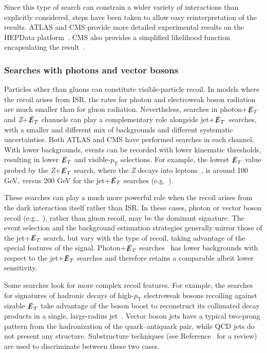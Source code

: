 \documentclass{ar-1col}
\newcommand{\pt}{\ensuremath{p_\mathrm{T}}\xspace}
\newcommand{\pT}{\ensuremath{p_\mathrm{T}}\xspace}
\newcommand{\MET}{\ensuremath{\slashed{E}_T}\xspace}
\begin{document}
{Since this type of search can constrain a wider variety of
interactions than explicitly considered, steps have been taken to
allow easy reinterpretation of the results. ATLAS and CMS provide
more detailed experimental results on the HEPData
platform~\cite{Maguire:2017ypu}. CMS also provides a simplified
likelihood function encapsulating the
result~\cite{Collaboration:2242860,Sirunyan:2017jix}.

\subsubsection{Searches with photons and vector bosons}\label{subsub:monoV}

Particles other than gluons can constitute visible-particle
recoil. In models where the recoil arises from ISR, the rates
for photon and electroweak boson radiation are much smaller than
for gluon radiation. Nevertheless, searches in photon+\MET and
\textit{Z}+\MET channels can play a complementary role alongside jet+\MET\ searches,
with a smaller and different mix of backgrounds and different
systematic uncertainties. Both ATLAS and CMS have performed
searches in each channel. With lower backgrounds, events can be
recorded with lower kinematic thresholds, resulting in lower \MET
and visible-\pt{} selections. For example, the lowest \MET value
probed by the \textit{Z}+\MET search, where the \textit{Z} decays into
leptons~\cite{Sirunyan:2017qfc,Aaboud:2017bja}, is around 100 GeV,
versus 200 GeV for the jet+\MET searches (e.g.~\cite{Sirunyan:2017jix}).

These searches can play a much more powerful role when the recoil
arises from the dark interaction itself rather than ISR. In these
cases, photon or vector boson recoil
(e.g.,~), rather than gluon
recoil, may be the dominant signature. The
event selection and the background estimation strategies generally
mirror those of the jet+\MET search, but vary with the type of
recoil, taking advantage of the special features of the signal. 
Photon+\MET searches~\cite{Aaboud:2017dor,CMS-PAS-EXO-16-053} has lower backgrounds
with respect to the jet+\MET searches and therefore retains a comparable albeit
lower sensitivity. 

Some searches look for more complex recoil features. For example, 
the searches for signatures of hadronic decays
of high-\pT{} electroweak bosons recoiling against sizable \MET
take advantage of the boson boost to reconstruct its collimated decay products
in a single, large-radius jet~\cite{Sirunyan:2017jix,ATLAS-CONF-2018-005}. 
Vector boson jets have a typical two-prong pattern from the hadronization
of the quark--antiquark pair, while QCD jets do not present any structure.
Substructure techniques (see Reference~ for a review) are
used to discriminate between these two cases. 

}
\end{document}
